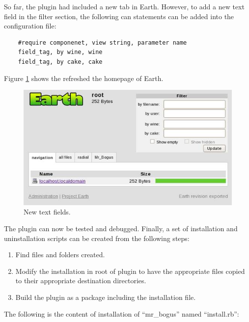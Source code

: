 \documentclass{article}
\begin{document}
So far, the plugin had included a new tab in Earth. However, to add a new text field in the filter section, the following can statements can be added into the configuration file:

\begin{verbatim}
    #require componenet, view string, parameter name
    field_tag, by wine, wine
    field_tag, by cake, cake
\end{verbatim}

Figure \ref{fig:instruction-9} shows the refreshed the homepage of Earth.

\begin{figure}
    \centering
    \includegraphics[scale=0.7]{fig/instruction-9.jpg}
    \caption{New text fields.}
    \label{fig:instruction-9}
\end{figure}

The plugin can now be tested and debugged. Finally, a set of installation and uninstallation scripts can be created from the following steps:

\begin{enumerate}
    \item Find files and folders created.
    \item Modify the installation in root of plugin to have the appropriate files copied to their appropriate destination directories.
    \item Build the plugin as a package including the installation file.
\end{enumerate}

The following is the content of installation of ``mr\_bogus'' named ``install.rb'':
\end{document}
